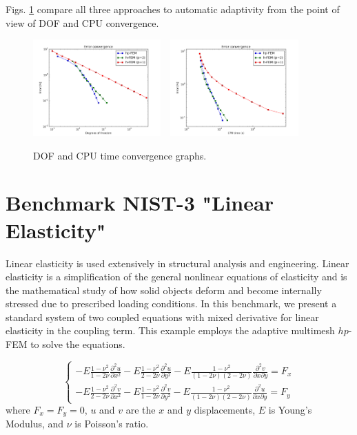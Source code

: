\documentclass[12pt]{elsarticle}
\begin{document}
Figs. \ref{fig:nist-2-conv} compare all
three approaches to automatic adaptivity from the point
of view of DOF and CPU convergence.

\begin{figure}[H]
\centering
\vspace{-5mm}
\includegraphics[height=3.7cm]{nist/nist-2/conv_dof_aniso.png}\ \
\includegraphics[height=3.7cm]{nist/nist-2/conv_cpu_aniso.png}
\vspace{-5mm}
\caption{DOF and CPU time convergence graphs.}
\vspace{-5mm}
\label{fig:nist-2-conv}
\end{figure}


\section{Benchmark NIST-3 "Linear Elasticity"}
\label{sec:bench-3}

Linear elasticity is used extensively in structural analysis
and engineering. Linear elasticity is a simplification
of the general nonlinear equations of elasticity and is the mathematical
study of how solid objects deform and become internally
stressed due to prescribed loading conditions.
In this benchmark, we present a standard system of two
coupled equations with mixed derivative for linear elasticity
in the coupling term. This example employs the adaptive multimesh $hp$-FEM
to solve the equations.

\begin{equation}\label{crack}
\left\{
\begin{array}{l}
\displaystyle
-E \frac{1-\nu^2}{1-2\nu} \frac{\partial^{2} u}{\partial x^{2}} - E\frac{1-\nu^2}{2-2 \nu} \frac{\partial^{2} u}{\partial y^{2}}
-E \frac{1-\nu^2}{(1-2\nu)(2-2\nu)} \frac{\partial^{2} v}{\partial x \partial y} = F_{x} \\
\displaystyle
-E \frac{1-\nu^2}{2-2\nu} \frac{\partial^{2} v}{\partial x^{2}} - E\frac{1-\nu^2}{1-2\nu} \frac{\partial^{2} v}{\partial y^{2}}
-E \frac{1-\nu^2}{(1-2\nu)(2-2\nu)} \frac{\partial^{2} u}{\partial x \partial y} = F_{y}
\end{array}
\right.
\end{equation}
where $F_{x} = F_{y} = 0$, $u$ and $v$ are the
$x$ and $y$ displacements, $E$ is Young's Modulus,
and $\nu$ is Poisson's ratio.
\end{document}
